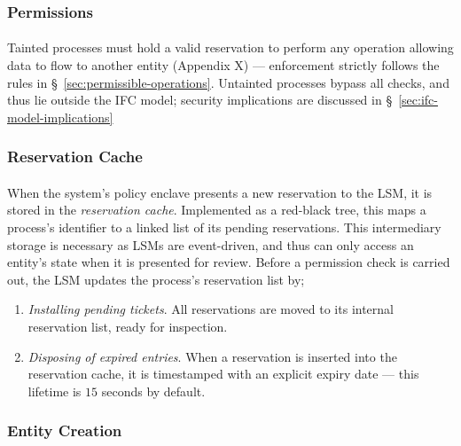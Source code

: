 \subsubsection{Permissions} 
\paragraph{} Tainted processes must hold a valid reservation to perform any operation allowing data to flow to another entity (Appendix X) --- enforcement strictly follows the rules in §~\ref{sec:permissible-operations}. Untainted processes bypass all checks, and thus lie outside the IFC model; security implications are discussed in §~\ref{sec:ifc-model-implications}


\subsubsection{Reservation Cache} 
\paragraph{} When the system's policy enclave presents a new reservation to the LSM, it is stored in the \textit{reservation cache}. Implemented as a red-black tree, this maps a process's identifier to a linked list of its pending reservations. This intermediary storage is necessary as LSMs are event-driven, and thus can only access an entity's state when it is presented for review. Before a permission check is carried out, the LSM updates the process's reservation list by;
\begin{enumerate}
    \item \textit{Installing pending tickets}. All reservations are moved to its internal reservation list, ready for inspection.
    \item \textit{Disposing of expired entries}. When a reservation is inserted into the reservation cache, it is timestamped with an explicit expiry date --- this lifetime is $15$ seconds by default.  
\end{enumerate}


\subsubsection{Entity Creation}
\label{sec:entity-creation}
